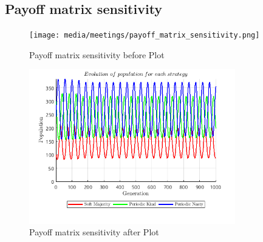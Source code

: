 \subsection{Payoff matrix sensitivity}
\begin{figure}[H]
    \centering
    \texttt{[image: media/meetings/payoff\_matrix\_sensitivity.png]}
    \caption{Payoff matrix sensitivity before Plot}
\end{figure}
\begin{figure}[H]
    \centering
    \includegraphics[width=0.8\textwidth]{media/meetings/payoff_matrix_sensitivity_after.png}
    \caption{Payoff matrix sensitivity after Plot}
\end{figure}


